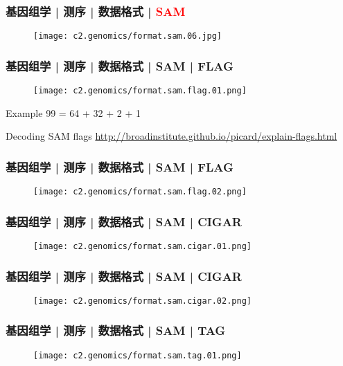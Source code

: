 \begin{frame}
  \frametitle{基因组学 | 测序 | 数据格式 | \textcolor{red}{SAM}}
  \begin{figure}
    \centering
    \texttt{[image: c2.genomics/format.sam.06.jpg]}
  \end{figure}
\end{frame}

\begin{frame}
  \frametitle{基因组学 | 测序 | 数据格式 | SAM | FLAG}
  \begin{figure}
    \centering
    \texttt{[image: c2.genomics/format.sam.flag.01.png]}
  \end{figure}
  \begin{block}{Example}
    99 = 64 + 32 + 2 + 1
  \end{block}
  \begin{block}{Decoding SAM flags}
  \href{http://broadinstitute.github.io/picard/explain-flags.html}{http://broadinstitute.github.io/picard/explain-flags.html}
  \end{block}
\end{frame}

\begin{frame}
  \frametitle{基因组学 | 测序 | 数据格式 | SAM | FLAG}
  \begin{figure}
    \centering
    \texttt{[image: c2.genomics/format.sam.flag.02.png]}
  \end{figure}
\end{frame}

\begin{frame}
  \frametitle{基因组学 | 测序 | 数据格式 | SAM | CIGAR}
  \begin{figure}
    \centering
    \texttt{[image: c2.genomics/format.sam.cigar.01.png]}
  \end{figure}
\end{frame}

\begin{frame}
  \frametitle{基因组学 | 测序 | 数据格式 | SAM | CIGAR}
  \begin{figure}
    \centering
    \texttt{[image: c2.genomics/format.sam.cigar.02.png]}
  \end{figure}
\end{frame}

\begin{frame}
  \frametitle{基因组学 | 测序 | 数据格式 | SAM | TAG}
  \begin{figure}
    \centering
    \texttt{[image: c2.genomics/format.sam.tag.01.png]}
  \end{figure}
\end{frame}

